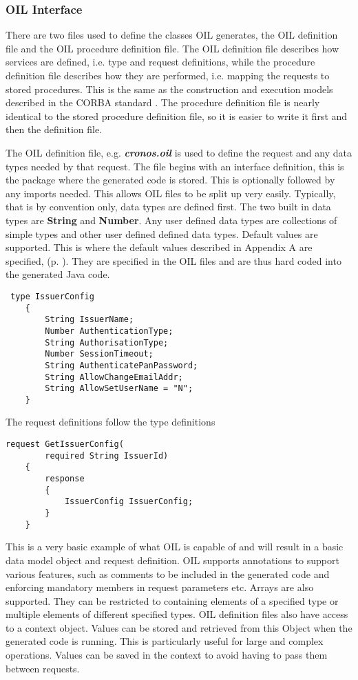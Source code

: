 \documentclass[a4paper, 11pt, titlepage]{article}
\begin{document}
\subsubsection{OIL Interface} 
There are two files used to define the classes OIL generates, the OIL definition file and the OIL procedure definition file. The OIL definition file describes how services are defined, i.e. type and request definitions, while the procedure definition file describes how they are performed, i.e. mapping the requests to stored procedures. This is the same as the construction and execution models described in the CORBA standard \cite{CORBA}. The procedure definition file is nearly identical to the stored procedure definition file, so it is easier to write it first and then the definition file. 

 
The OIL definition file, e.g. \textbf{\textit{cronos.oil}} is used to define the request and any data types needed by that request. The file begins with an interface definition, this is the package where the generated code is stored. This is optionally followed by any imports needed. This allows OIL files to be split up very easily. Typically, that is by convention only, data types are defined first. The two built in data types are \textbf{String} and \textbf{Number}. Any user defined data types are collections of simple types and other user defined defined data types. Default values are supported. This is where the default values described in Appendix A are specified, (p. \pageref{default_retail_values}). They are specified in the OIL files and are thus hard coded into the generated Java code. 
\begin{verbatim} 
 type IssuerConfig 
    { 
        String IssuerName; 
        Number AuthenticationType; 
        String AuthorisationType; 
        Number SessionTimeout; 
        String AuthenticatePanPassword; 
        String AllowChangeEmailAddr; 
        String AllowSetUserName = "N"; 
    } 
\end{verbatim} 
The request definitions follow the type definitions 
\begin{verbatim} 
request GetIssuerConfig( 
        required String IssuerId) 
    { 
        response 
        { 
            IssuerConfig IssuerConfig; 
        } 
    } 
\end{verbatim} 
This is a very basic example of what OIL is capable of and will result in a basic data model object and request definition. OIL supports annotations to support various features, such as comments to be included in the generated code and enforcing mandatory members in request parameters etc. Arrays are also supported. They can be restricted to containing elements of a specified type or multiple elements of different specified types. OIL definition files also have access to a context object. Values can be stored and retrieved from this Object when the generated code is running. This is particularly useful for large and complex operations. Values can be saved in the context to avoid having to pass them between requests. 
 
\end{document}
